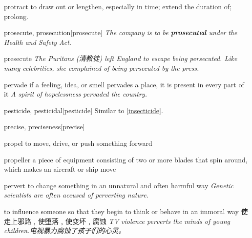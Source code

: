 \begin{DefWord}{protract}
    to draw out or lengthen, especially in time; extend the duration of; prolong.
\end{DefWord}

\begin{DefWord}{prosecute, prosecution}[prosecute]
    \textit{The company is to be \textbf{prosecuted} under the Health and Safety Act.}
\end{DefWord}

\begin{DefWord}{presecute}
    \textit{The Puritans (清教徒) left England to escape being persecuted. Like many celebrities, she complained of being persecuted by the press.}
\end{DefWord}

\begin{DefWord}{pervade}
    if a feeling, idea, or smell pervades a place, it is present in every part of it
    \textit{A spirit of hopelessness pervaded the country.}
\end{DefWord}

\begin{DefWord}{pesticide, pesticidal}[pesticide]
    Similar to \ref{insecticide}.
\end{DefWord}


\begin{DefWord}{precise, preciseness}[precise]
\end{DefWord}

\begin{DefWord}{propel}
    to move, drive, or push something forward
\end{DefWord}


\begin{DefWord}{propeller}
    a piece of equipment consisting of two or more blades that spin around, which makes an aircraft or ship move
\end{DefWord}

\begin{DefWord}{pervert}
    to change something in an unnatural and often harmful way
    \textit{Genetic scientists are often accused of perverting nature.}

    to influence someone so that they begin to think or behave in an immoral way 使走上邪路﹐使堕落﹐使变坏﹐腐蚀
    \textit{TV violence perverts the minds of young children.电视暴力腐蚀了孩子们的心灵。}
\end{DefWord}

